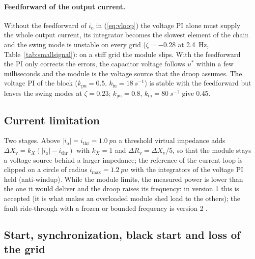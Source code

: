 \documentclass[11pt,a4paper]{scrartcl}
\newcommand{\ped}[1]{_{\mathrm{#1}}}
\begin{document}
\begin{onehalfspace}
\paragraph{Feedforward of the output current.} Without the feedforward of $i\ped{o}$ in (\ref{eq:vloop}) the voltage PI alone must supply the whole output current, its integrator becomes the slowest element of the chain and the swing mode is unstable on every grid ($\zeta = -0.28$ at \SI{2.4}{Hz}, Table~\ref{tab:smallsignal}): on a stiff grid the module slips. With the feedforward the PI only corrects the errors, the capacitor voltage follows $u^*$ within a few milliseconds and the module is the voltage source that the droop assumes. The voltage PI of the block ($k\ped{pu} = 0.5$, $k\ped{iu} = \SI{18}{s^{-1}}$) is stable with the feedforward but leaves the swing modes at $\zeta = 0.23$; $k\ped{pu} = 0.8$, $k\ped{iu} = \SI{80}{s^{-1}}$ give 0.45.

\subsection{Current limitation}

Two stages. Above $|i\ped{o}| = i\ped{thr} = \SI{1.0}{pu}$ a threshold virtual impedance \cite{paquette2015} adds $\Delta X\ped{v} = k_X(|i\ped{o}| - i\ped{thr})$ with $k_X = 1$ and $\Delta R\ped{v} = \Delta X\ped{v}/5$, so that the module stays a voltage source behind a larger impedance; the reference of the current loop is clipped on a circle of radius $i\ped{max} = \SI{1.2}{pu}$ with the integrators of the voltage PI held (anti-windup). While the module limits, the measured power is lower than the one it would deliver and the droop raises its frequency: in version 1 this is accepted (it is what makes an overloaded module shed load to the others); the fault ride-through with a frozen or bounded frequency is version 2 \cite{kiel_curlim}.

\subsection{Start, synchronization, black start and loss of the grid}


\end{onehalfspace}
\end{document}
